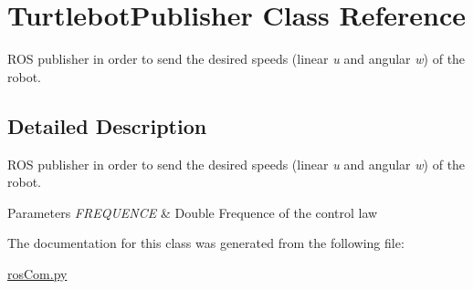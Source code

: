 \hypertarget{classTurtlebotPublisher}{}\section{Turtlebot\+Publisher Class Reference}
\label{classTurtlebotPublisher}


R\+OS publisher in order to send the desired speeds (linear {\itshape u} and angular {\itshape w}) of the robot.  




\subsection{Detailed Description}
R\+OS publisher in order to send the desired speeds (linear {\itshape u} and angular {\itshape w}) of the robot. 


\begin{DoxyParams}{Parameters}
{\em F\+R\+E\+Q\+U\+E\+N\+CE} & Double Frequence of the control law \\
\hline
\end{DoxyParams}


The documentation for this class was generated from the following file\+:\begin{DoxyCompactItemize}
\item 
\hyperlink{rosCom_8py}{ros\+Com.\+py}\end{DoxyCompactItemize}
